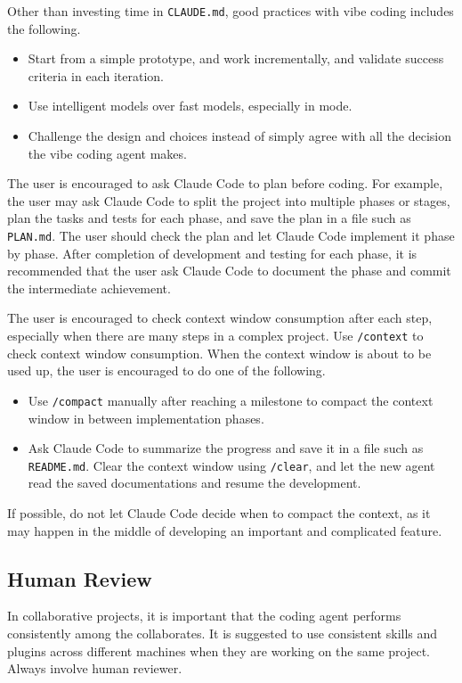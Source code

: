 Other than investing time in \verb|CLAUDE.md|, good practices with vibe coding includes the following.
\begin{itemize}
  \item Start from a simple prototype, and work incrementally, and validate success criteria in each iteration.
  \item Use intelligent models over fast models, especially in  mode.
  \item Challenge the design and choices instead of simply agree with all the decision the vibe coding agent makes.
\end{itemize}

The user is encouraged to ask Claude Code to plan before coding. For example, the user may ask Claude Code to split the project into multiple phases or stages, plan the tasks and tests for each phase, and save the plan in a file such as \verb|PLAN.md|. The user should check the plan and let Claude Code implement it phase by phase. After completion of development and testing for each phase, it is recommended that the user ask Claude Code to document the phase and commit the intermediate achievement.

The user is encouraged to check context window consumption after each step, especially when there are many steps in a complex project. Use \verb|/context| to check context window consumption. When the context window is about to be used up, the user is encouraged to do one of the following.
\begin{itemize}
  \item Use \verb|/compact| manually after reaching a milestone to compact the context window in between implementation phases.
  \item Ask Claude Code to summarize the progress and save it in a file such as \verb|README.md|. Clear the context window using \verb|/clear|, and let the new agent read the saved documentations and resume the development.
\end{itemize}
If possible, do not let Claude Code decide when to compact the context, as it may happen in the middle of developing an important and complicated feature.

\subsection{Human Review}

In collaborative projects, it is important that the coding agent performs consistently among the collaborates. It is suggested to use consistent skills and plugins across different machines when they are working on the same project. Always involve human reviewer.

